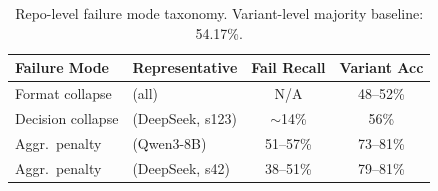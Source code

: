 \begin{table}[t]
\centering
\small
\caption{Repo-level failure mode taxonomy. Variant-level majority baseline: 54.17\%.}
\label{tab:taxonomy}
\setlength{\tabcolsep}{6pt}
\renewcommand{\arraystretch}{1.0}
\begin{tabular}{llcc}
\toprule
\textbf{Failure Mode} & \textbf{Representative} & \textbf{Fail Recall} & \textbf{Variant Acc} \\
\midrule
Format collapse & \cwm{} (all) & N/A & 48--52\% \\
Decision collapse & \cls{} (DeepSeek, s123) & ${\sim}$14\% & 56\% \\
Aggr.\ penalty & \cls{} (Qwen3-8B) & 51--57\% & 73--81\% \\
Aggr.\ penalty & \cls{} (DeepSeek, s42) & 38--51\% & 79--81\% \\
\bottomrule
\end{tabular}
\end{table}

